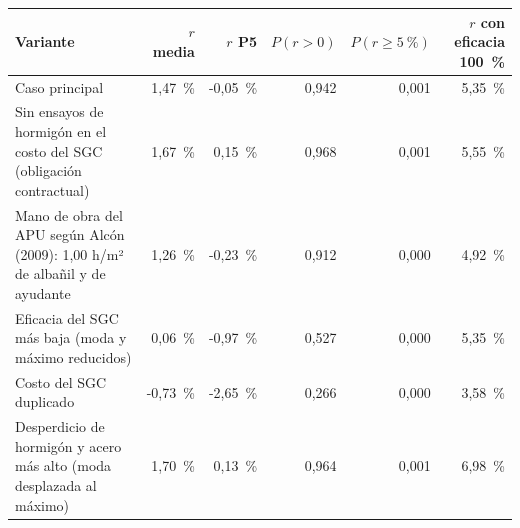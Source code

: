 \begin{tabularx}{\linewidth}{@{}Lrrrrr@{}}
\toprule
\textbf{Variante} & \textbf{$r$ media} & \textbf{$r$ P5} & \textbf{$P(r>0)$} & \textbf{$P(r \geq 5~\%)$} & \textbf{$r$ con eficacia 100~\%} \\
\midrule
Caso principal & 1,47~\% & -0,05~\% & 0,942 & 0,001 & 5,35~\% \\
Sin ensayos de hormigón en el costo del SGC (obligación contractual) & 1,67~\% & 0,15~\% & 0,968 & 0,001 & 5,55~\% \\
Mano de obra del APU según Alcón (2009): 1,00 h/m² de albañil y de ayudante & 1,26~\% & -0,23~\% & 0,912 & 0,000 & 4,92~\% \\
Eficacia del SGC más baja (moda y máximo reducidos) & 0,06~\% & -0,97~\% & 0,527 & 0,000 & 5,35~\% \\
Costo del SGC duplicado & -0,73~\% & -2,65~\% & 0,266 & 0,000 & 3,58~\% \\
Desperdicio de hormigón y acero más alto (moda desplazada al máximo) & 1,70~\% & 0,13~\% & 0,964 & 0,001 & 6,98~\% \\
\bottomrule
\end{tabularx}
